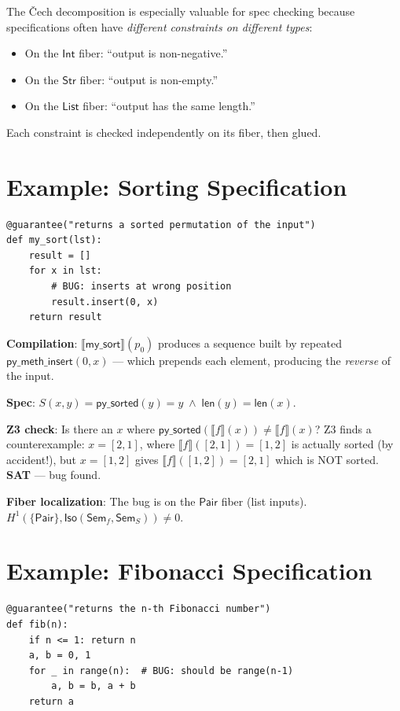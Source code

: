 \documentclass[11pt,a4paper]{report}
\theoremstyle{definition}
\theoremstyle{plain}
\newcommand{\den}[1]{\llbracket #1 \rrbracket}
\newcommand{\Sem}{\mathsf{Sem}}
\newcommand{\Iso}{\mathsf{Iso}}
\newcommand{\Hone}{H^1}
\begin{document}
The \v{C}ech decomposition is especially valuable for spec checking
because specifications often have \emph{different constraints on
different types}:
\begin{itemize}
  \item On the $\mathsf{Int}$ fiber: ``output is non-negative.''
  \item On the $\mathsf{Str}$ fiber: ``output is non-empty.''
  \item On the $\mathsf{List}$ fiber: ``output has the same length.''
\end{itemize}

Each constraint is checked independently on its fiber, then glued.

\section{Example: Sorting Specification}

\begin{lstlisting}[caption={Sorting with spec check}]
@guarantee("returns a sorted permutation of the input")
def my_sort(lst):
    result = []
    for x in lst:
        # BUG: inserts at wrong position
        result.insert(0, x)
    return result
\end{lstlisting}

\textbf{Compilation}: $\den{\mathsf{my\_sort}}(p_0)$ produces a
sequence built by repeated $\mathsf{py\_meth\_insert}(0, x)$ ---
which prepends each element, producing the \emph{reverse} of the input.

\textbf{Spec}: $S(x, y) = \mathsf{py\_sorted}(y) = y \;\land\;
\mathsf{len}(y) = \mathsf{len}(x)$.

\textbf{Z3 check}: Is there an $x$ where $\mathsf{py\_sorted}(\den{f}(x))
\neq \den{f}(x)$?  Z3 finds a counterexample: $x = [2, 1]$, where
$\den{f}([2,1]) = [1, 2]$ is actually sorted (by accident!), but
$x = [1, 2]$ gives $\den{f}([1,2]) = [2, 1]$ which is NOT sorted.
\textbf{SAT} --- bug found.

\textbf{Fiber localization}: The bug is on the $\mathsf{Pair}$ fiber
(list inputs).  $\Hone(\{\mathsf{Pair}\}, \Iso(\Sem_f, \Sem_S)) \neq 0$.

\section{Example: Fibonacci Specification}

\begin{lstlisting}[caption={Fibonacci with off-by-one bug}]
@guarantee("returns the n-th Fibonacci number")
def fib(n):
    if n <= 1: return n
    a, b = 0, 1
    for _ in range(n):  # BUG: should be range(n-1)
        a, b = b, a + b
    return a
\end{lstlisting}
\end{document}
